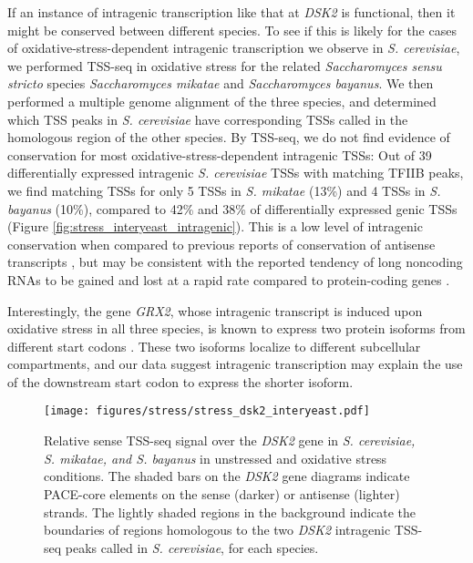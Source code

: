 If an instance of intragenic transcription like that at \textit{DSK2} is functional, then it might be conserved between different species.
To see if this is likely for the cases of oxidative-stress-dependent intragenic transcription we observe in \textit{S. cerevisiae}, we performed TSS-seq in oxidative stress for the related \textit{Saccharomyces sensu stricto} species \textit{Saccharomyces mikatae} and \textit{Saccharomyces bayanus}.
We then performed a multiple genome alignment of the three species, and determined which TSS peaks in \textit{S. cerevisiae} have corresponding TSSs called in the homologous region of the other species.
By TSS-seq, we do not find evidence of conservation for most oxidative-stress-dependent intragenic TSSs: Out of 39 differentially expressed intragenic \textit{S. cerevisiae} TSSs with matching TFIIB peaks, we find matching TSSs for only 5 TSSs in \textit{S. mikatae} (13\%) and 4 TSSs in \textit{S. bayanus} (10\%), compared to 42\% and 38\% of differentially expressed genic TSSs (Figure \ref{fig:stress_interyeast_intragenic}).
This is a low level of intragenic conservation when compared to previous reports of conservation of antisense transcripts \citep{yassour2010, rhind2011}, but may be consistent with the reported tendency of long noncoding RNAs to be gained and lost at a rapid rate compared to protein-coding genes \citep{kutter2012}.

Interestingly, the gene \textit{GRX2}, whose intragenic transcript is induced upon oxidative stress in all three species, is known to express two protein isoforms from different start codons \citep{pedrajas2002}.
These two isoforms localize to different subcellular compartments, and our data suggest intragenic transcription may explain the use of the downstream start codon to express the shorter isoform.

\begin{figure}[h]
    \texttt{[image: figures/stress/stress\_dsk2\_interyeast.pdf]}
    \caption[Sense TSS-seq signal over the \textit{DSK2} gene in \textit{S. cerevisiae, S. mikatae, and S. bayanus} in unstressed and oxidative stress conditions.]{Relative sense TSS-seq signal over the \textit{DSK2} gene in \textit{S. cerevisiae, S. mikatae, and S. bayanus} in unstressed and oxidative stress conditions. The shaded bars on the \textit{DSK2} gene diagrams indicate PACE-core elements on the sense (darker) or antisense (lighter) strands. The lightly shaded regions in the background indicate the boundaries of regions homologous to the two \textit{DSK2} intragenic TSS-seq peaks called in \textit{S. cerevisiae}, for each species.}
    \label{fig:stress_dsk2_interyeast}
\end{figure}

